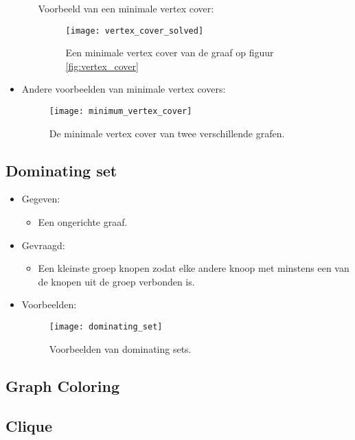 \begin{itemize}
\begin{itemize}
        Voorbeeld van een minimale vertex cover:
        \begin{figure}[ht]
            \centering
            \texttt{[image: vertex\_cover\_solved]}
            \caption{Een minimale vertex cover van de graaf op figuur \ref{fig:vertex_cover}}
            \label{fig:vertex_cover_solved}
        \end{figure}
    \end{itemize}
    \item Andere voorbeelden van minimale vertex covers:
    \begin{figure}[ht]
        \centering
        \texttt{[image: minimum\_vertex\_cover]}
        \caption{De minimale vertex cover van twee verschillende grafen.}
        \label{fig:minimum_vertex_cover}
    \end{figure}
\end{itemize}

\subsection{Dominating set}
\begin{itemize}
    \item Gegeven:
    \begin{itemize}
        \item Een ongerichte graaf.
    \end{itemize}
    \item Gevraagd:
    \begin{itemize}
        \item Een kleinste groep knopen zodat elke andere knoop met minstens een van de knopen uit de groep verbonden is.
    \end{itemize}
    \item Voorbeelden:
    \begin{figure}[ht]
        \centering
        \texttt{[image: dominating\_set]}
        \caption{Voorbeelden van dominating sets.}
        \label{fig:dominating_set}
    \end{figure}
\end{itemize}

\subsection{Graph Coloring}


\subsection{Clique}

